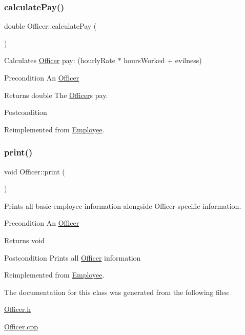 \subsubsection{\texorpdfstring{calculate\+Pay()}{calculatePay()}}
{\footnotesize\ttfamily double Officer\+::calculate\+Pay (\begin{DoxyParamCaption}{ }\end{DoxyParamCaption})\hspace{0.3cm}{\ttfamily [virtual]}}

Calculates \hyperlink{classOfficer}{Officer} pay\+: (hourly\+Rate $\ast$ hours\+Worked + evilness)

\begin{DoxyPrecond}{Precondition}
An \hyperlink{classOfficer}{Officer} 
\end{DoxyPrecond}
\begin{DoxyReturn}{Returns}
double The \hyperlink{classOfficer}{Officer}\textquotesingle{}s pay. 
\end{DoxyReturn}
\begin{DoxyPostcond}{Postcondition}

\end{DoxyPostcond}


Reimplemented from \hyperlink{classEmployee_a01c2c44e15434237db28832f6972e960}{Employee}.

\mbox{\label{classOfficer_aeadece05a1a0b7fb29bd412830d2e07a}} 
\subsubsection{\texorpdfstring{print()}{print()}}
{\footnotesize\ttfamily void Officer\+::print (\begin{DoxyParamCaption}{ }\end{DoxyParamCaption})\hspace{0.3cm}{\ttfamily [virtual]}}

Prints all basic employee information alongside Officer-\/specific information.

\begin{DoxyPrecond}{Precondition}
An \hyperlink{classOfficer}{Officer} 
\end{DoxyPrecond}
\begin{DoxyReturn}{Returns}
void 
\end{DoxyReturn}
\begin{DoxyPostcond}{Postcondition}
Prints all \hyperlink{classOfficer}{Officer} information 
\end{DoxyPostcond}


Reimplemented from \hyperlink{classEmployee_a79556ad700627dba88049f487a34a762}{Employee}.



The documentation for this class was generated from the following files\+:\begin{DoxyCompactItemize}
\item 
\hyperlink{Officer_8h}{Officer.\+h}\item 
\hyperlink{Officer_8cpp}{Officer.\+cpp}\end{DoxyCompactItemize}
